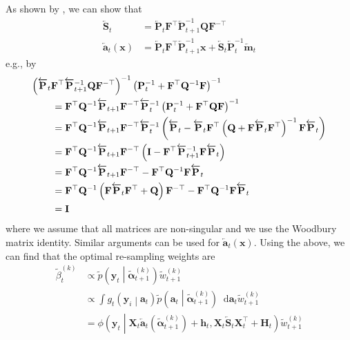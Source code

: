 \documentclass[notitlepage]{article}
\renewcommand{\vec}[1]{\bm{#1}}
\newcommand{\vecLarrow}[1]{\overleftarrow{\vec{#1}}}
\newcommand{\mat}[1]{\mathbf{#1}}
\newcommand{\matLarrow}[1]{\overleftarrow{\mat{#1}}}
\newcommand{\Lparen}[1]{\left( #1\right)}
\newcommand{\Cond}[2]{ #1 \middle\vert  #2}
\newcommand*\diff{\mathop{}\!\mathrm{d}}
\newcommand{\optor}[2]{#1\Lparen{#2}}
\newcommand{\optorC}[3]{\optor{#1}{\Cond{#2}{#3}}}
\newcommand{\pdenstC}[2]{\optorC{\widetilde p}{#1}{#2}}
\newcommand{\normaldC}[3]{\optorC{\phi}{#1}{#2,#3}}
\newcommand{\particB}[3]{\widetilde{#1}_{#2}^{\Lparen{#3}}}
\begin{document}
As shown by \cite{fearnhead10}, we can show that %
%
\begin{align}\label{eq:BWartCovar}
	\matLarrow{S}_t &= \matLarrow{P}_t\mat{F}^\top\matLarrow{P}_{t + 1}^{-1}\mat{Q}\mat{F}^{-\top} \\
%
	\vecLarrow{a}_t(\vec x) &=
		\matLarrow{P}_t\mat{F}^\top\matLarrow{P}_{t + 1}^{-1}\vec x
		+ \matLarrow{S}_t\matLarrow{P}_t^{-1} \vecLarrow{m}_t \nonumber
\end{align}%
%
e.g., by %
%
\begin{align*}
\Lparen{\matLarrow{P}_t\mat{F}^\top\matLarrow{P}_{t + 1}^{-1}
	\mat{Q}\mat{F}^{-\top}}^{-1}
	\Lparen{\mat P^{-1}_t + \mat F^\top\mat Q^{-1}\mat F}^{-1}
	\hspace{-175pt}& \\
&= \mat F^\top \mat Q^{-1}\matLarrow{P}_{t + 1}
	\mat F^{-\top}\matLarrow{P}_t^{-1}
	\Lparen{\mat P^{-1}_t + \mat F^\top\mat Q\mat F}^{-1} \\
&= \mat F^\top \mat Q^{-1}\matLarrow{P}_{t + 1}
	\mat F^{-\top}\matLarrow{P}_t^{-1}
	\Lparen{\matLarrow{P}_t - \matLarrow{P}_t
		\mat F^\top\Lparen{\mat Q + \mat F \matLarrow{P}_t 
			\mat F^\top}^{-1}
		\mat{F}\matLarrow{P}_t} \\
&= \mat F^\top \mat Q^{-1}\matLarrow{P}_{t + 1}
	\mat F^{-\top}
	\Lparen{\mat I -
		\mat F^\top\matLarrow{P}_{t + 1}^{-1}
		\mat{F}\matLarrow{P}_t} \\
&= \mat F^\top \mat Q^{-1}\matLarrow{P}_{t + 1}
	\mat F^{-\top} - \mat F^\top \mat Q^{-1} \mat F \matLarrow{P}_t \\
&= \mat F^\top \mat Q^{-1}\Lparen{
		\mat F \matLarrow{P}_t \mat F^\top + \mat Q}
	\mat F^{-\top} - \mat F^\top \mat Q^{-1} \mat F \matLarrow{P}_t \\
&= \mat I
\end{align*}
%
where we assume that all matrices are non-singular and we use the Woodbury matrix identity.
 Similar arguments can be used for $\vecLarrow{a}_t(\vec x)$. Using the above, we can 
 find that the optimal re-sampling weights are%
%
\begin{align}\label{eq:bwReWeight}
\particB{\beta}{t}{k} &\propto %
		\pdenstC{\vec{y}_t}{\particB{\vec\alpha}{t + 1}k}
		\particB w{t + 1}k \\
&\propto \int \nonumber
	\optorC{g_t}{\vec y_i}{\vec a_t}
	\pdenstC{\vec a_t}{\particB{\vec\alpha}{t + 1}k}
	\diff\vec a_t \particB w{t + 1}k \\
	&=\normaldC{\vec y_t }{
		\mat X_t \vecLarrow{a}_t(
		\particB{\vec\alpha}{t + 1}k) + \vec h_t}{%
	\mat X_t\matLarrow{S}_t\mat X_t^\top + \mat H_t}
	\particB w{t + 1}k\nonumber
\end{align}%
\end{document}
